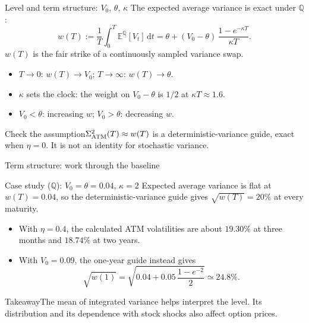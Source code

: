 \documentclass[handout,10pt,t,aspectratio=169]{beamer}
\newenvironment{keybox}{\begin{exampleblock}{Takeaway}}{\end{exampleblock}}
\newenvironment{watchbox}{\begin{alertblock}{Check the assumption}}{\end{alertblock}}
\newcommand{\E}{\mathbb E}
\newcommand{\Q}{\mathbb Q}
\newcommand{\dd}{\,\mathrm d}
\begin{document}
\begin{frame}{Level and term structure: \(V_0\), \(\theta\), \(\kappa\)}
\small
The expected average variance is exact under \(\Q\):
\[
w(T):=\frac1T\int_0^T\E^\Q[V_t]\dd t
=\theta+(V_0-\theta)\,\frac{1-e^{-\kappa T}}{\kappa T}.
\]
\(w(T)\) is the fair strike of a continuously sampled variance swap.
\begin{itemize}
\item \(T\to0\): \(w(T)\to V_0\); \quad \(T\to\infty\): \(w(T)\to\theta\).
\item \(\kappa\) sets the clock: the weight on \(V_0-\theta\) is \(1/2\) at \(\kappa T\approx1.6\).
\item \(V_0<\theta\): increasing \(w\); \quad \(V_0>\theta\): decreasing \(w\).
\end{itemize}
\begin{watchbox}\(\Sigma_{\rm ATM}^2(T)\approx w(T)\) is a deterministic-variance guide,
exact when \(\eta=0\). It is not an identity for stochastic variance.\end{watchbox}
\end{frame}

\begin{frame}{Term structure: work through the baseline}
\small
\begin{exampleblock}{Case study (\(\Q\)): \(V_0=\theta=0.04\), \(\kappa=2\)}
Expected average variance is flat at \(w(T)=0.04\), so the deterministic-variance
guide gives \(\sqrt{w(T)}=20\%\) at every maturity.
\end{exampleblock}
\begin{itemize}
\item With \(\eta=0.4\), the calculated ATM volatilities are about \(19.30\%\)
at three months and \(18.74\%\) at two years.
\item With \(V_0=0.09\), the one-year guide instead gives
\[
\sqrt{w(1)}=\sqrt{0.04+0.05\,\frac{1-e^{-2}}{2}}\simeq24.8\%.
\]
\end{itemize}
\begin{keybox}The mean of integrated variance helps interpret the level.
Its distribution and its dependence with stock shocks also affect option prices.\end{keybox}
\end{frame}
\end{document}
